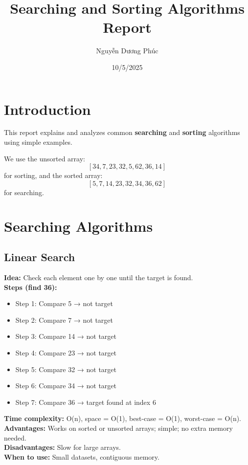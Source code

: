 \documentclass[a4paper,12pt]{article}
\title{Searching and Sorting Algorithms Report}
\author{Nguyễn Dương Phúc}
\date{10/5/2025}
\begin{document}
\maketitle
\tableofcontents
\newpage

\section{Introduction}
This report explains and analyzes common \textbf{searching} and \textbf{sorting} algorithms using simple examples.  

We use the unsorted array:
\[
[34, 7, 23, 32, 5, 62, 36, 14]
\]
for sorting, and the sorted array:
\[
[5, 7, 14, 23, 32, 34, 36, 62]
\]
for searching.

\newpage
\section{Searching Algorithms}

\subsection{Linear Search}
\textbf{Idea:} Check each element one by one until the target is found.  \\
\textbf{Steps (find 36):}
\begin{itemize}
  \item Step 1: Compare 5 → not target
  \item Step 2: Compare 7 → not target
  \item Step 3: Compare 14 → not target
  \item Step 4: Compare 23 → not target
  \item Step 5: Compare 32 → not target
  \item Step 6: Compare 34 → not target
  \item Step 7: Compare 36 → target found at index 6
\end{itemize}
\textbf{Time complexity:} O(n), space = O(1), best-case = O(1), worst-case = O(n).  \\
\textbf{Advantages:} Works on sorted or unsorted arrays; simple; no extra memory needed. \\
\textbf{Disadvantages:} Slow for large arrays.  \\
\textbf{When to use:} Small datasets, contiguous memory.
\end{document}
